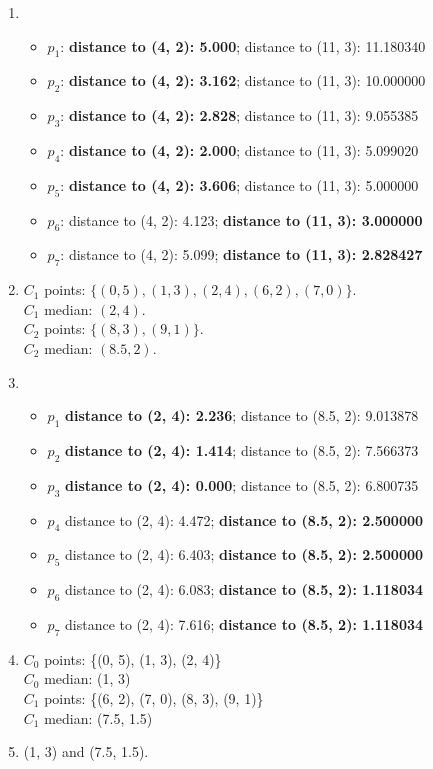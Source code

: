 \begin{enumerate}[label=(\alph*)]
	\item
	      \begin{itemize}
		      \item $p_1$: \textbf{distance to (4, 2): 5.000}; {distance to (11, 3): 11.180340}
		      \item $p_2$: \textbf{distance to (4, 2): 3.162}; {distance to (11, 3): 10.000000}
		      \item $p_3$: \textbf{distance to (4, 2): 2.828}; {distance to (11, 3): 9.055385}
		      \item $p_4$: \textbf{distance to (4, 2): 2.000}; {distance to (11, 3): 5.099020}
		      \item $p_5$: \textbf{distance to (4, 2): 3.606}; {distance to (11, 3): 5.000000}
		      \item $p_6$: {distance to (4, 2): 4.123}; \textbf{distance to (11, 3): 3.000000}
		      \item $p_7$: {distance to (4, 2): 5.099}; \textbf{distance to (11, 3): 2.828427}
	      \end{itemize}

	\item
	      $C_1$ points: $\{(0, 5), (1, 3), (2, 4), (6, 2), (7, 0)\}$.\\
	      $C_1$ median: $(2, 4)$. \\
	      $C_2$ points: $\{(8, 3), (9, 1)\}$.\\
	      $C_2$ median: $(8.5, 2)$.

	\item
	      \begin{itemize}
		      \item $p_1$ \textbf{distance to (2, 4): 2.236}; {distance to (8.5, 2): 9.013878}
		      \item $p_2$ \textbf{distance to (2, 4): 1.414}; {distance to (8.5, 2): 7.566373}
		      \item $p_3$ \textbf{distance to (2, 4): 0.000}; {distance to (8.5, 2): 6.800735}
		      \item $p_4$ {distance to (2, 4): 4.472}; \textbf{distance to (8.5, 2): 2.500000}
		      \item $p_5$ {distance to (2, 4): 6.403}; \textbf{distance to (8.5, 2): 2.500000}
		      \item $p_6$ {distance to (2, 4): 6.083}; \textbf{distance to (8.5, 2): 1.118034}
		      \item $p_7$ {distance to (2, 4): 7.616}; \textbf{distance to (8.5, 2): 1.118034}
	      \end{itemize}

	\item
	      $C_0$ points: \{(0, 5), (1, 3), (2, 4)\} \\
	      $C_0$ median: (1, 3) \\
	      $C_1$ points: \{(6, 2), (7, 0), (8, 3), (9, 1)\} \\
	      $C_1$ median: (7.5, 1.5)

	\item (1, 3) and (7.5, 1.5).

\end{enumerate}

